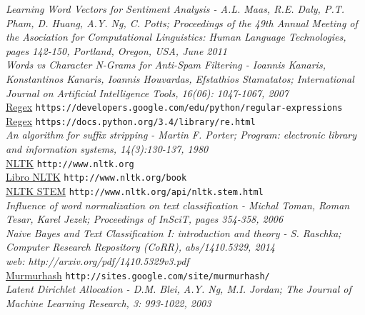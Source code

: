 \documentclass[12pt]{article}
\begin{document}
\textit{Learning Word Vectors for Sentiment Analysis - A.L. Maas, R.E. Daly, P.T. Pham, D. Huang, A.Y. Ng, C. Potts; Proceedings of the 49th Annual Meeting of the Asociation for Computational Linguistics: Human Language Technologies, pages 142-150, Portland, Oregon, USA, June 2011}\\

\textit{Words vs Character N-Grams for Anti-Spam Filtering - Ioannis Kanaris, Konstantinos Kanaris, Ioannis Houvardas, Efstathios Stamatatos; International Journal on Artificial Intelligence Tools, 16(06): 1047-1067, 2007}\\

\href{https://developers.google.com/edu/python/regular-expressions}{Regex} \verb+https://developers.google.com/edu/python/regular-expressions+\\

\href{https://docs.python.org/3.4/library/re.html}{Regex} \verb+https://docs.python.org/3.4/library/re.html+\\

\textit{An algorithm for suffix stripping - Martin F. Porter; Program: electronic library and information systems, 14(3):130-137, 1980}\\

\href{http://www.nltk.org}{NLTK} \verb+http://www.nltk.org+\\

\href{http://www.nltk.org/book}{Libro NLTK} \verb+http://www.nltk.org/book+\\

\href{http://www.nltk.org/api/nltk.stem.html}{NLTK STEM} \verb+http://www.nltk.org/api/nltk.stem.html+\\

\textit{Influence of word normalization on text classification - Michal Toman, Roman Tesar, Karel Jezek; Proceedings of InSciT, pages 354-358, 2006}\\

\textit{Naive Bayes and Text Classification I: introduction and theory - S. Raschka; Computer Research Repository (CoRR), abs/1410.5329, 2014\\
web: http://arxiv.org/pdf/1410.5329v3.pdf}\\

\href{http://sites.google.com/site/murmurhash/}{Murmurhash} \verb+http://sites.google.com/site/murmurhash/+\\

\textit{Latent Dirichlet Allocation - D.M. Blei, A.Y. Ng, M.I. Jordan; The Journal of Machine Learning Research, 3: 993-1022, 2003}\\
\end{document}
